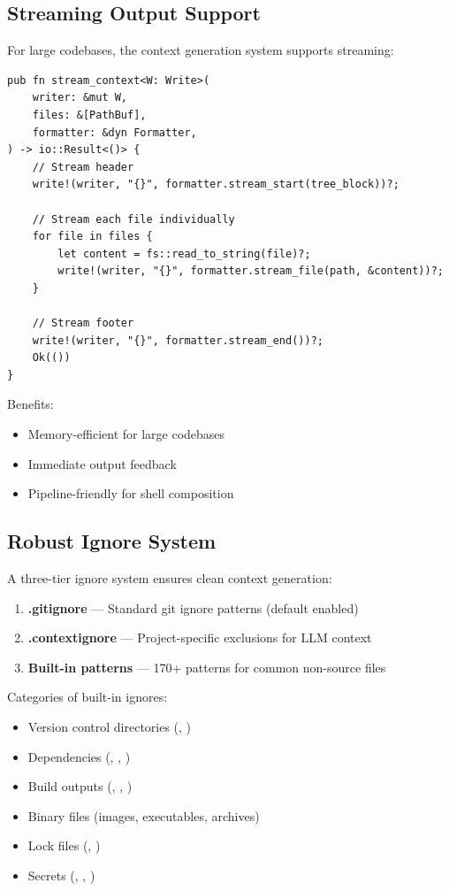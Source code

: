 \subsection{Streaming Output Support}

For large codebases, the context generation system supports streaming:

\begin{lstlisting}[style=rustcode, caption={Streaming context generation}]
pub fn stream_context<W: Write>(
    writer: &mut W,
    files: &[PathBuf],
    formatter: &dyn Formatter,
) -> io::Result<()> {
    // Stream header
    write!(writer, "{}", formatter.stream_start(tree_block))?;
    
    // Stream each file individually
    for file in files {
        let content = fs::read_to_string(file)?;
        write!(writer, "{}", formatter.stream_file(path, &content))?;
    }
    
    // Stream footer
    write!(writer, "{}", formatter.stream_end())?;
    Ok(())
}
\end{lstlisting}

Benefits:
\begin{itemize}
    \item Memory-efficient for large codebases
    \item Immediate output feedback
    \item Pipeline-friendly for shell composition
\end{itemize}

\subsection{Robust Ignore System}

A three-tier ignore system ensures clean context generation:

\begin{enumerate}
    \item \textbf{.gitignore} --- Standard git ignore patterns (default enabled)
    \item \textbf{.contextignore} --- Project-specific exclusions for LLM context
    \item \textbf{Built-in patterns} --- 170+ patterns for common non-source files
\end{enumerate}

Categories of built-in ignores:
\begin{itemize}
    \item Version control directories (, )
    \item Dependencies (, , )
    \item Build outputs (, , )
    \item Binary files (images, executables, archives)
    \item Lock files (, )
    \item Secrets (, , )
\end{itemize}

